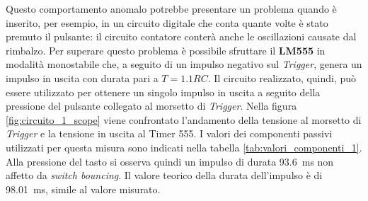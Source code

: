 Questo comportamento anomalo potrebbe presentare un problema quando è inserito, per esempio, in un circuito digitale che conta quante volte è stato premuto il pulsante: il circuito contatore conterà anche le oscillazioni causate dal rimbalzo. Per superare questo problema è possibile sfruttare il \textbf{LM555} in modalità monostabile che, a seguito di un impulso negativo sul \textit{Trigger}, genera un impulso in uscita con durata pari a $T=1.1RC$. Il circuito realizzato, quindi, può essere utilizzato per ottenere un singolo impulso in uscita a seguito della pressione del pulsante collegato al morsetto di \textit{Trigger}. Nella figura \ref{fig:circuito_1_scope} viene confrontato l'andamento della tensione al morsetto di \textit{Trigger} e la tensione in uscita al Timer 555. I valori dei componenti passivi utilizzati per questa misura sono indicati nella tabella \ref{tab:valori_componenti_1}. Alla pressione del tasto si osserva quindi un impulso di durata \SI{93.6}{\milli\second} non affetto da \textit{switch bouncing}. Il valore teorico della durata dell'impulso è di \SI{98.01}{\milli\second}, simile al valore misurato.


